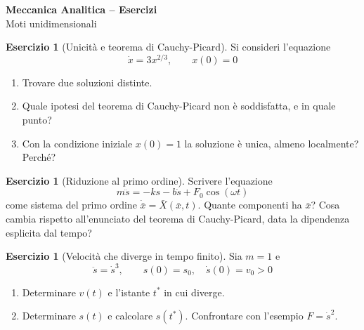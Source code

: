 \documentclass[11pt, a4paper, openright]{book}
\theoremstyle{plain}
\theoremstyle{definition}
\newtheorem{esercizio}[teorema]{Esercizio}
\theoremstyle{remark}
\begin{document}
\begin{center}
    {\LARGE \textbf{Meccanica Analitica -- Esercizi}}\\[0.3cm]
    {\large Moti unidimensionali}
\end{center}
\vspace{0.5cm}
\begin{esercizio}[Unicità e teorema di Cauchy-Picard]\label{es:mu1}
    Si consideri l'equazione
    \begin{equation}
        \dot{x} = 3x^{2/3}, \qquad x(0) = 0
    \end{equation}
    \begin{enumerate}[label=(\alph*)]
        \item Trovare due soluzioni distinte.
        \item Quale ipotesi del teorema di Cauchy-Picard non è soddisfatta, e in quale punto?
        \item Con la condizione iniziale $x(0) = 1$ la soluzione è unica, almeno localmente? Perché?
    \end{enumerate}
\end{esercizio}

\begin{esercizio}[Riduzione al primo ordine]\label{es:mu2}
    Scrivere l'equazione
    \begin{equation}
        m\ddot{s} = -ks - b\dot{s} + F_0\cos(\omega t)
    \end{equation}
    come sistema del primo ordine $\dot{\bar{x}} = \bar{X}(\bar{x}, t)$. Quante componenti ha $\bar{x}$? Cosa cambia rispetto all'enunciato del teorema di Cauchy-Picard, data la dipendenza esplicita dal tempo?
\end{esercizio}

\begin{esercizio}[Velocità che diverge in tempo finito]\label{es:mu3}
    Sia $m = 1$ e
    \begin{equation}
        \ddot{s} = \dot{s}^3, \qquad s(0) = s_0, \quad \dot{s}(0) = v_0 > 0
    \end{equation}
    \begin{enumerate}[label=(\alph*)]
        \item Determinare $v(t)$ e l'istante $t^*$ in cui diverge.
        \item Determinare $s(t)$ e calcolare $s(t^*)$. Confrontare con l'esempio $F = \dot{s}^2$.
    \end{enumerate}
\end{esercizio}
\end{document}
